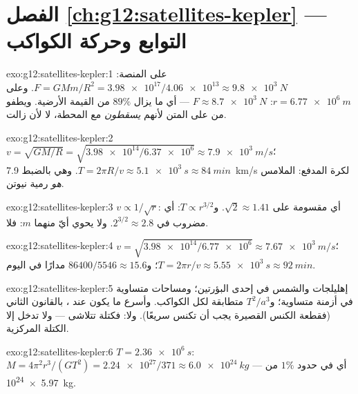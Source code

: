 \section*{الفصل \ref{ch:g12:satellites-kepler} --- التوابع وحركة الكواكب}

\begin{solution}{exo:g12:satellites-kepler:1}
على المنصة: $F = GMm/R^2 = \num{3.98e17}/\num{4.06e13} \approx
\qty{9.8e3}{N}$. وعلى $r = \qty{6.77e6}{m}$:
$F \approx \qty{8.7e3}{N}$ --- أي ما يزال $89\%$ من القيمة الأرضية. ويطفو
من على المتن لأنهم \emph{يسقطون} مع المحطة،
لا لأن  زالت.
\end{solution}

\begin{solution}{exo:g12:satellites-kepler:2}
$v = \sqrt{GM/R} = \sqrt{\num{3.98e14}/\num{6.37e6}} \approx
\qty{7.9e3}{m/s}$؛ $T = 2\pi R/v \approx \qty{5.1e3}{s} \approx
\qty{84}{min}$. وهي بالضبط \qty{7.9}{km/s} لكرة المدفع:
 الملامس \emph{هو} رمية نيوتن.
\end{solution}

\begin{solution}{exo:g12:satellites-kepler:3}
$v \propto 1/\sqrt{r}$: أي مقسومة على $\sqrt 2 \approx 1.41$.
و$T \propto r^{3/2}$: أي مضروب في $2^{3/2} \approx 2.8$. ولا يحوي أيّ منهما
$m$: فلا.
\end{solution}

\begin{solution}{exo:g12:satellites-kepler:4}
$v = \sqrt{\num{3.98e14}/\num{6.77e6}} \approx \qty{7.67e3}{m/s}$؛
$T = 2\pi r/v \approx \qty{5.55e3}{s} \approx \qty{92}{min}$؛
و$\num{86400}/5546 \approx 15.6$ مدارًا في اليوم.
\end{solution}

\begin{solution}{exo:g12:satellites-kepler:5}
إهليلجات والشمس في إحدى البؤرتين؛ ومساحات متساوية في أزمنة متساوية؛
و$T^2/a^3$ متطابقة لكل الكواكب. وأسرع ما يكون عند ، بالقانون
الثاني (فقطعة الكنس القصيرة يجب أن تكنس سريعًا). ولا: فكتلة 
تتلاشى --- ولا تدخل إلا الكتلة المركزية.
\end{solution}

\begin{solution}{exo:g12:satellites-kepler:6}
$T = \qty{2.36e6}{s}$: $M = 4\pi^2 r^3/(GT^2) =
\num{2.24e27}/371 \approx \qty{6.0e24}{kg}$ --- أي في حدود $1\%$ من
\qty{5.97e24}{kg}.
\end{solution}

